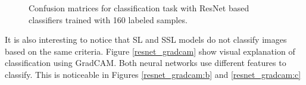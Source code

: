\documentclass{article}
\begin{document}
\begin{figure}[H]
    \centering
    \qquad
    \caption{Confusion matrices for classification task with ResNet based classifiers trained with 160 labeled samples.}
    \label{resnet_conf}
\end{figure}

It is also interesting to notice that SL and SSL models do not classify images based on the same criteria. Figure \ref{resnet_gradcam} show visual explanation of classification using GradCAM. Both neural networks use different features to classify. This is noticeable in Figures \ref{resnet_gradcam:b} and \ref{resnet_gradcam:c}
\end{document}
